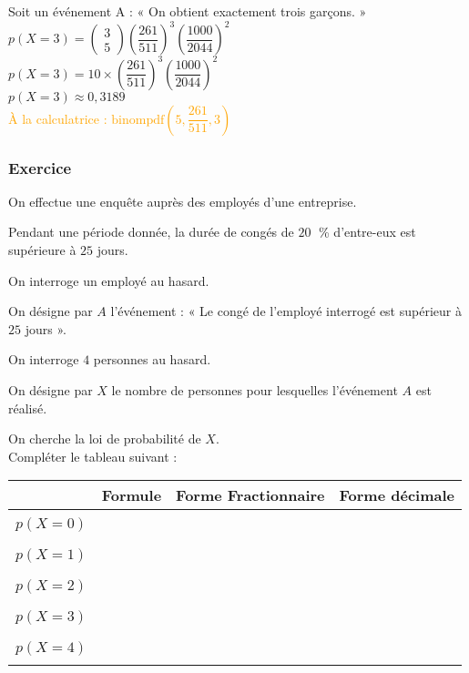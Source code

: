 Soit un événement A : « On obtient exactement trois garçons. » \\

$p\left(X = 3\right) = \left(\begin{array}{c} 3 \\ 5 \end{array}\right) \left(\dfrac{261}{511}\right)^3\left(\dfrac{1000}{2044}\right)^2$ \\

$p\left(X=3\right) = 10 \times \left(\dfrac{261}{511}\right)^3\left(\dfrac{1000}{2044}\right)^2 $ \\

$ p\left(X=3\right)  \approx 0,3189 $ \\

\textcolor{orange}{À la calculatrice : $\mathrm{binompdf} \left(5,\dfrac{261}{511},3\right)$} 

\newpage

\vspace*{-1cm}

\subsubsection{Exercice}

On effectue une enquête auprès des employés d'une entreprise. 

Pendant une période donnée, la durée de congés de $20 \;$ \% d'entre-eux est supérieure à $25$ jours. 

On interroge un employé au hasard. 

On désigne par $A$ l'événement : « Le congé de l'employé interrogé est supérieur à $25$ jours ». 

On interroge $4$ personnes au hasard. 

On désigne par $X$ le nombre de personnes pour lesquelles l'événement $A$ est réalisé. 

On cherche la loi de probabilité de $X$. \\

Compléter le tableau suivant : \\

\begin{tabular}{|c|c|c|c|}
\hline
& Formule & Forme Fractionnaire & Forme décimale \\
\hline
& & & \\
$p\left(X = 0\right)$ & & & \\ 
& & & \\
\hline
& & & \\
$p\left(X = 1\right)$ & & & \\ 
& & & \\
\hline
& & & \\
$p\left(X = 2\right)$ & & & \\ 
& & & \\
\hline
& & & \\
$p\left(X = 3\right)$ & & & \\ 
& & & \\
\hline
& & & \\
$p\left(X = 4\right)$ & & & \\ 
& & & \\
\hline
\end{tabular}


